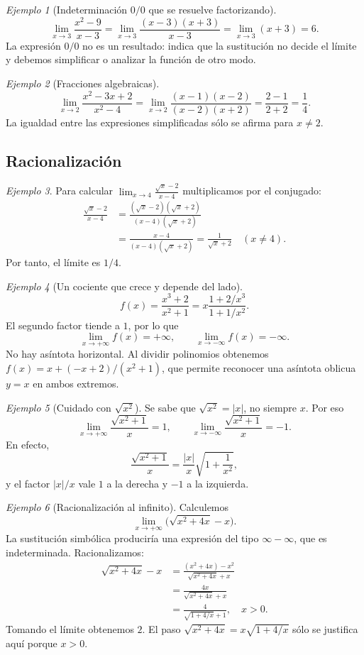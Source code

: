 \documentclass[12pt]{article}
\theoremstyle{remark}
\newtheorem{ejemplo}{Ejemplo}
\begin{document}
\begin{ejemplo}[Indeterminación $0/0$ que se resuelve factorizando]
\[
\lim_{x\to3}\frac{x^2-9}{x-3}
=\lim_{x\to3}\frac{(x-3)(x+3)}{x-3}
=\lim_{x\to3}(x+3)=\boxed{6}.
\]
La expresión $0/0$ no es un resultado: indica que la sustitución no decide el límite y debemos simplificar o analizar la función de otro modo.
\end{ejemplo}

\begin{ejemplo}[Fracciones algebraicas]
\[
\lim_{x\to2}\frac{x^2-3x+2}{x^2-4}
=\lim_{x\to2}\frac{(x-1)(x-2)}{(x-2)(x+2)}
=\frac{2-1}{2+2}=\boxed{\frac14}.
\]
La igualdad entre las expresiones simplificadas sólo se afirma para $x\ne2$.
\end{ejemplo}

\subsection*{Racionalización}
\begin{ejemplo}
Para calcular $\displaystyle\lim_{x\to4}\frac{\sqrt{x}-2}{x-4}$ multiplicamos por el conjugado:
\begin{align*}
\frac{\sqrt{x}-2}{x-4}
&=\frac{(\sqrt{x}-2)(\sqrt{x}+2)}{(x-4)(\sqrt{x}+2)}\\
&=\frac{x-4}{(x-4)(\sqrt{x}+2)}
=\frac{1}{\sqrt{x}+2}\quad(x\ne4).
\end{align*}
Por tanto, el límite es $\boxed{1/4}$.
\end{ejemplo}

\begin{ejemplo}[Un cociente que crece y depende del lado]
\[
 f(x)=\frac{x^3+2}{x^2+1}=x\frac{1+2/x^3}{1+1/x^2}.
\]
El segundo factor tiende a $1$, por lo que
\[
 \lim_{x\to+\infty}f(x)=+\infty,\qquad
 \lim_{x\to-\infty}f(x)=-\infty.
\]
No hay asíntota horizontal. Al dividir polinomios obtenemos $f(x)=x+(-x+2)/(x^2+1)$, que permite reconocer una asíntota oblicua $y=x$ en ambos extremos.
\end{ejemplo}

\begin{ejemplo}[Cuidado con $\sqrt{x^2}$]
Se sabe que $\sqrt{x^2}=|x|$, no siempre $x$. Por eso
\[
 \lim_{x\to+\infty}\frac{\sqrt{x^2+1}}{x}=1,
 \qquad
 \lim_{x\to-\infty}\frac{\sqrt{x^2+1}}{x}=-1.
\]
En efecto,
\[
 \frac{\sqrt{x^2+1}}{x}
 =\frac{|x|}{x}\sqrt{1+\frac1{x^2}},
\]
y el factor $|x|/x$ vale $1$ a la derecha y $-1$ a la izquierda.
\end{ejemplo}

\begin{ejemplo}[Racionalización al infinito]
Calculemos
\[
 \lim_{x\to+\infty}\bigl(\sqrt{x^2+4x}-x\bigr).
\]
La sustitución simbólica produciría una expresión del tipo $\infty-\infty$, que es indeterminada. Racionalizamos:
\begin{align*}
\sqrt{x^2+4x}-x
 &=\frac{(x^2+4x)-x^2}{\sqrt{x^2+4x}+x}\\
 &=\frac{4x}{\sqrt{x^2+4x}+x}\\
 &=\frac4{\sqrt{1+4/x}+1},\quad x>0.
\end{align*}
Tomando el límite obtenemos $\boxed{2}$. El paso $\sqrt{x^2+4x}=x\sqrt{1+4/x}$ sólo se justifica aquí porque $x>0$.
\end{ejemplo}
\end{document}
